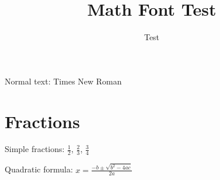 \documentclass{article}
\title{Math Font Test}
\author{Test}
\begin{document}
\maketitle

Normal text: Times New Roman

\section{Fractions}

Simple fractions: $\frac{1}{2}$, $\frac{2}{3}$, $\frac{3}{4}$

Quadratic formula: $x = \frac{-b \pm \sqrt{b^2 - 4ac}}{2a}$
\end{document}
